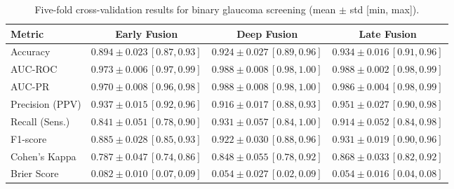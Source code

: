 \documentclass[preprint,12pt]{elsarticle}
\begin{document}
\begin{table}[!t]
    \centering
    \caption{Five-fold cross-validation results for binary glaucoma screening (mean $\pm$ std [min, max]).}
    \label{tab:cv_binary_compact}
    \scriptsize
    \setlength{\tabcolsep}{6pt}
    \begin{tabular}{|l|c|c|c|}
        \hline
        \textbf{Metric}                & \textbf{Early Fusion} & \textbf{Deep Fusion} & \textbf{Late Fusion} \\
        \hline
        Accuracy                       &
        $0.894 \pm 0.023\,[0.87,0.93]$ &
        $0.924 \pm 0.027\,[0.89,0.96]$ &
        $0.934 \pm 0.016\,[0.91,0.96]$                                                                       \\

        AUC-ROC                        &
        $0.973 \pm 0.006\,[0.97,0.99]$ &
        $0.988 \pm 0.008\,[0.98,1.00]$ &
        $0.988 \pm 0.002\,[0.98,0.99]$                                                                       \\

        AUC-PR                         &
        $0.970 \pm 0.008\,[0.96,0.98]$ &
        $0.988 \pm 0.008\,[0.98,1.00]$ &
        $0.986 \pm 0.004\,[0.98,0.99]$                                                                       \\

        Precision (PPV)                &
        $0.937 \pm 0.015\,[0.92,0.96]$ &
        $0.916 \pm 0.017\,[0.88,0.93]$ &
        $0.951 \pm 0.027\,[0.90,0.98]$                                                                       \\

        Recall (Sens.)                 &
        $0.841 \pm 0.051\,[0.78,0.90]$ &
        $0.931 \pm 0.057\,[0.84,1.00]$ &
        $0.914 \pm 0.052\,[0.84,0.98]$                                                                       \\

        F1-score                       &
        $0.885 \pm 0.028\,[0.85,0.93]$ &
        $0.922 \pm 0.030\,[0.88,0.96]$ &
        $0.931 \pm 0.019\,[0.90,0.96]$                                                                       \\

        Cohen’s Kappa                  &
        $0.787 \pm 0.047\,[0.74,0.86]$ &
        $0.848 \pm 0.055\,[0.78,0.92]$ &
        $0.868 \pm 0.033\,[0.82,0.92]$                                                                       \\

        Brier Score                    &
        $0.082 \pm 0.010\,[0.07,0.09]$ &
        $0.054 \pm 0.027\,[0.02,0.09]$ &
        $0.054 \pm 0.016\,[0.04,0.08]$                                                                       \\
        \hline
    \end{tabular}
\end{table}
\end{document}
